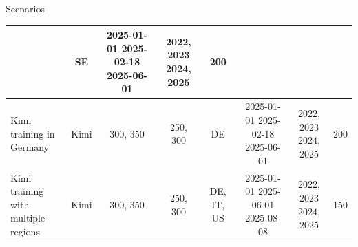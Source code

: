 \begin{frame}[t]{Scenarios}{}
{\begin{tabular}{l|c|c|c|c|c|c|c}
      & SE & \makecell{2025-01-01 2025-02-18 \\ 2025-06-01} &
      \makecell{2022, 2023 \\ 2024, 2025} & 200 \\
      \hline
      \makecell{Kimi training in \\ Germany} & Kimi & 300, 350 & 250,
      300 & DE & \makecell{2025-01-01 2025-02-18 \\ 2025-06-01} &
      \makecell{2022, 2023 \\ 2024, 2025} & 200 \\
      \hline
      \makecell{Kimi training with \\ multiple regions} & Kimi & 300,
      350 & 250, 300 & DE, IT, US & \makecell{2025-01-01 2025-06-01
      \\ 2025-08-08} & \makecell{2022, 2023 \\ 2024, 2025} & 150 \\
      \bottomrule
    \end{tabular}%
  }

\end{frame}

